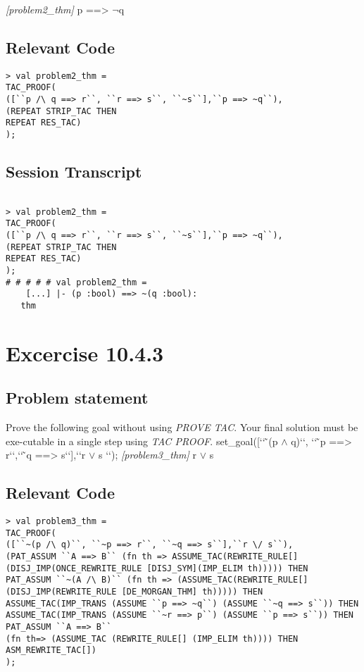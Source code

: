 \documentclass{report}
\begin{document}
\emph{[problem2_thm]}
 p ==> $\lnot$q
\section{Relevant Code}
\label{rel-code-10-4-2}
\begin{lstlisting}[frame=TBlr]
> val problem2_thm =
TAC_PROOF(
([``p /\ q ==> r``, ``r ==> s``, ``~s``],``p ==> ~q``),
(REPEAT STRIP_TAC THEN
REPEAT RES_TAC)
);
\end{lstlisting}

\section{Session Transcript}
\label{trans-10-4-2}

\begin{session}
  \begin{scriptsize}
\begin{verbatim}

> val problem2_thm =
TAC_PROOF(
([``p /\ q ==> r``, ``r ==> s``, ``~s``],``p ==> ~q``),
(REPEAT STRIP_TAC THEN
REPEAT RES_TAC)
);
# # # # # val problem2_thm =
    [...] |- (p :bool) ==> ~(q :bool):
   thm

\end{verbatim}
  \end{scriptsize}
\end{session}



\chapter{Excercise 10.4.3}
\label{cha:10.4.3}


\section{Problem statement}
\label{problem-statement-10-4-3}
Prove the following goal without using \emph{PROVE TAC}. Your final solution must be exe-cutable in a single step using \emph{TAC PROOF}.
set_goal([‘‘ ̃(p $\land$ q)‘‘, ‘‘ ̃p ==> r‘‘,‘‘ ̃q ==> s‘‘],‘‘r $\lor$ s ‘‘);
\emph{[problem3_thm]}
r $\lor$ s

\section{Relevant Code}
\label{rel-code-10-4-3}
\begin{lstlisting}[frame=TBlr]
> val problem3_thm =
TAC_PROOF(
([``~(p /\ q)``, ``~p ==> r``, ``~q ==> s``],``r \/ s``),
(PAT_ASSUM ``A ==> B`` (fn th => ASSUME_TAC(REWRITE_RULE[]
(DISJ_IMP(ONCE_REWRITE_RULE [DISJ_SYM](IMP_ELIM th))))) THEN
PAT_ASSUM ``~(A /\ B)`` (fn th => (ASSUME_TAC(REWRITE_RULE[]
(DISJ_IMP(REWRITE_RULE [DE_MORGAN_THM] th))))) THEN
ASSUME_TAC(IMP_TRANS (ASSUME ``p ==> ~q``) (ASSUME ``~q ==> s``)) THEN
ASSUME_TAC(IMP_TRANS (ASSUME ``~r ==> p``) (ASSUME ``p ==> s``)) THEN
PAT_ASSUM ``A ==> B`` 
(fn th=> (ASSUME_TAC (REWRITE_RULE[] (IMP_ELIM th)))) THEN
ASM_REWRITE_TAC[])
);
\end{lstlisting}
\end{document}
